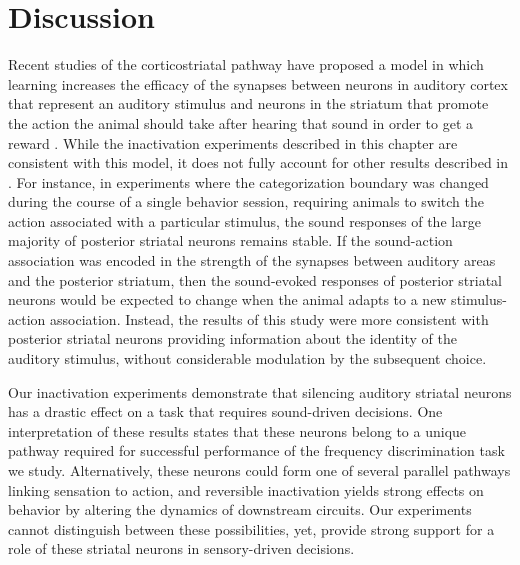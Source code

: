 \section{Discussion}

Recent studies of the corticostriatal pathway have proposed a model in which learning increases the efficacy of the synapses between neurons in auditory cortex that represent an auditory stimulus and neurons in the striatum that promote the action the animal should take after hearing that sound in order to get a reward \citep{Znamenskiy2013, Xiong2015}.
%
While the inactivation experiments described in this chapter are consistent with this model,  it does not fully account for other results described in \citet{Guo2018}.
%
For instance, in experiments where the categorization boundary was changed during the course of a single behavior session, requiring animals to switch the action associated with a particular stimulus, the sound responses of the large majority of posterior striatal neurons remains stable. 
%
If the sound-action association was encoded in the strength of the synapses between auditory areas and the posterior striatum, then the sound-evoked responses of posterior striatal neurons would be expected to change when the animal adapts to a new stimulus-action association.
%
Instead, the results of this study were more consistent with posterior striatal neurons providing information about the identity of the auditory stimulus, without considerable modulation by the subsequent choice. 

Our inactivation experiments demonstrate that silencing auditory striatal neurons has a drastic effect on a task that requires sound-driven decisions.
%
One interpretation of these results states that these neurons belong to a unique pathway required for successful performance of the frequency discrimination task we study.
%
Alternatively, these neurons could form one of several parallel pathways linking sensation to action, and reversible inactivation yields strong effects on behavior by altering the dynamics of downstream circuits.
%
Our experiments cannot distinguish between these possibilities, yet, provide strong support for a role of these striatal neurons in sensory-driven decisions.

